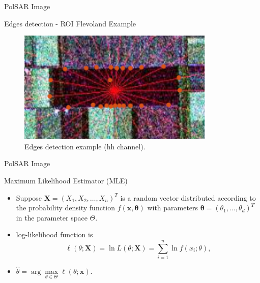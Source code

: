 \documentclass[10pt]{beamer}
\begin{document}
\begin{frame}[fragile]{PolSAR Image}
\begin{alertblock}{Edges detection - ROI Flevoland Example} 
\begin{figure}[hbt]
\centering
	\includegraphics[width=.7\linewidth]{flevoland_radial_25_point_hh_crop}
	\caption{Edges detection example ($\text{hh}$ channel).}
\label{flevoland_radial_4look}
\end{figure}
\end{alertblock}
\end{frame}

\begin{frame}[fragile]{PolSAR Image}
\begin{alertblock}{Maximum Likelihood Estimator (MLE)}
\begin{itemize}
	\item Suppose $\mathbf{X}=(X_1,X_2,\dots,X_n)^T$ is a random vector distributed according to the probability density function $f(\mathbf{x},\mathbf{\theta})$ with parameters $\mathbf{\theta}=(\theta_1,\dots,\theta_d)^T$ in the parameter space $\Theta$.
    \item log-likelihood function is
\begin{equation}
	\ell(\theta;\mathbf{X})= \ln L(\theta;\mathbf{X}) = \sum_{i=1}^{n}\ln f(x_i;\theta),
	\label{eq_05}
\end{equation}
     \item $\widehat{\theta}= \arg\max\limits_{\theta\in\Theta}\ell(\theta;\mathbf{x})$.
\end{itemize}
\end{alertblock}
\end{frame}
\end{document}
